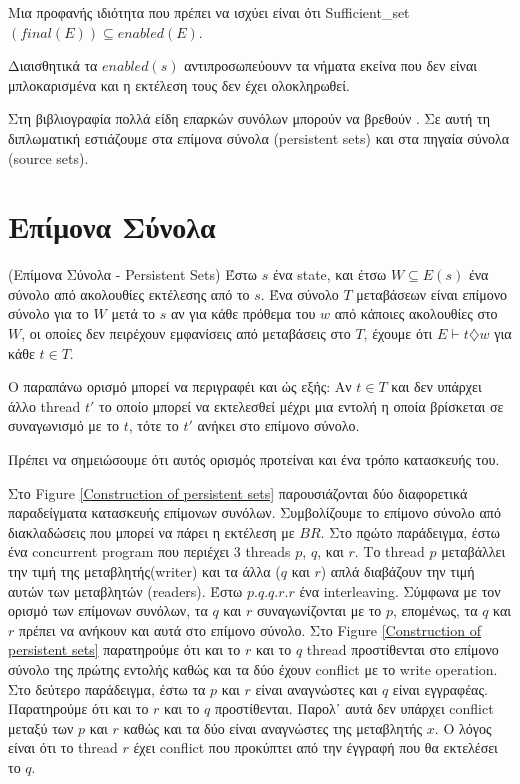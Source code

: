 Μια προφανής ιδιότητα που πρέπει να ισχύει είναι ότι Sufficient\_set$(final(E)) \subseteq enabled(E)$.

Διαισθητικά τα $enabled(s)$ αντιπροσωπεύουνν τα νήματα εκείνα που δεν είναι μπλοκαρισμένα και η εκτέλεση τους δεν έχει ολοκληρωθεί.

Στη βιβλιογραφία πολλά είδη επαρκών συνόλων μπορούν να βρεθούν \cite{Godefroid1996}. 
Σε αυτή τη διπλωματική εστιάζουμε στα επίμονα σύνολα (persistent sets) και στα πηγαία σύνολα (source sets).


\section{Επίμονα Σύνολα}

\begin{definition}{(Επίμονα Σύνολα - Persistent Sets)}
Έστω $s$ ένα state, και έτσω $W \subseteq E(s)$ ένα σύνολο από ακολουθίες εκτέλεσης από το 
$s$. Ένα σύνολο $T$ μεταβάσεων είναι επίμονο σύνολο για το $W$
μετά το $s$ αν για κάθε πρόθεμα του $w$ από κάποιες ακολουθίες στο $W$, οι οποίες δεν πειρέχουν εμφανίσεις από μεταβάσεις στο 
$T$,  έχουμε ότι $E \vdash t \diamondsuit w$ για κάθε $t \in T$.
\end{definition}

Ο παραπάνω ορισμό μπορεί να περιγραφέι και ώς εξής: Αν $t \in T$ και δεν υπάρχει άλλο thread $t'$ το οποίο μπορεί να εκτελεσθεί μέχρι μια εντολή η οποία βρίσκεται σε συναγωνισμό
με το $t$, τότε το $t'$ ανήκει στο επίμονο σύνολο.

Πρέπει να σημειώσουμε ότι αυτός ορισμός προτείναι και ένα τρόπο κατασκευής του.

Στο Figure \ref{Construction of persistent sets} παρουσιάζονται δύο διαφορετικά παραδείγματα κατασκευής επίμονων συνόλων. Συμβολίζουμε το επίμονο σύνολο από διακλαδώσεις που μπορεί 
να πάρει η εκτέλεση με $BR{}$.
Στο πϱώτο παράδειγμα, έστω ένα concurrent program που περιέχει 3 threads $p$, $q$, και $r$. Το thread $p$ μεταβάλλει την τιμή της μεταβλητής(writer) και τα άλλα ($q$ και $r$) απλά διαβάζουν την τιμή αυτών των μεταβλητών (readers).
Έστω $p.q.q.r.r$ ένα interleaving. Σύμφωνα με τον ορισμό των επίμονων συνόλων, τα $q$ και $r$ συναγωνίζονται με το $p$, επομένως, τα $q$ και $r$ πρέπει να ανήκουν και αυτά
στο επίμονο σύνολο.
Στο Figure \ref{Construction of persistent sets} παρατηρούμε ότι και το $r$ και το $q$ thread προστίθενται στο επίμονο σύνολο της πρώτης εντολής καθώς και τα δύο έχουν conflict 
με το write operation.
Στο δεύτερο παράδειγμα, έστω τα $p$ και $r$ είναι αναγνώστες και $q$ είναι εγγραφέας. Παρατηρούμε ότι και το $r$ και το $q$ προστίθενται. Παρολ᾽ αυτά δεν υπάρχει conflict μεταξύ των 
$p$ και $r$ καθώς και τα δύο είναι αναγνώστες της μεταβλητής 
$x$. Ο λόγος είναι ότι το thread $r$ έχει conflict που προκύπτει από την έγγραφή που θα εκτελέσει το $q$.

